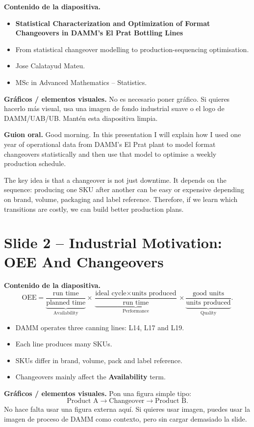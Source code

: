 \documentclass[11pt,a4paper]{article}
\newcommand{\slide}[1]{\newpage\section*{#1}}
\newcommand{\say}{\textbf{Guion oral.} }
\newcommand{\content}{\textbf{Contenido de la diapositiva.} }
\newcommand{\figs}{\textbf{Gráficos / elementos visuales.} }
\begin{document}
\content
\begin{itemize}
    \item \textbf{Statistical Characterization and Optimization of Format Changeovers in DAMM's El Prat Bottling Lines}
    \item From statistical changeover modelling to production-sequencing optimisation.
    \item Jose Calatayud Mateu.
    \item MSc in Advanced Mathematics -- Statistics.
\end{itemize}

\figs
No es necesario poner gr\'afico. Si quieres hacerlo m\'as visual, usa una imagen
de fondo industrial suave o el logo de DAMM/UAB/UB. Mant\'en esta diapositiva limpia.

\say
Good morning. In this presentation I will explain how I used one year of
operational data from DAMM's El Prat plant to model format changeovers
statistically and then use that model to optimise a weekly production schedule.

The key idea is that a changeover is not just downtime. It depends on the
sequence: producing one SKU after another can be easy or expensive depending on
brand, volume, packaging and label reference. Therefore, if we learn which
transitions are costly, we can build better production plans.

\slide{Slide 2 -- Industrial Motivation: OEE And Changeovers}

\content
\[
\text{OEE} =
\underbrace{\frac{\text{run time}}{\text{planned time}}}_{\text{Availability}}
\times
\underbrace{\frac{\text{ideal cycle}\times\text{units produced}}{\text{run time}}}_{\text{Performance}}
\times
\underbrace{\frac{\text{good units}}{\text{units produced}}}_{\text{Quality}}.
\]

\begin{itemize}
    \item DAMM operates three canning lines: L14, L17 and L19.
    \item Each line produces many SKUs.
    \item SKUs differ in brand, volume, pack and label reference.
    \item Changeovers mainly affect the \textbf{Availability} term.
\end{itemize}

\figs
Pon una figura simple tipo:
\[
\text{Product A}
\longrightarrow
\boxed{\text{Changeover}}
\longrightarrow
\text{Product B}.
\]
No hace falta usar una figura externa aqu\'i. Si quieres usar imagen, puedes usar
la imagen de proceso de DAMM como contexto, pero sin cargar demasiado la slide.
\end{document}
